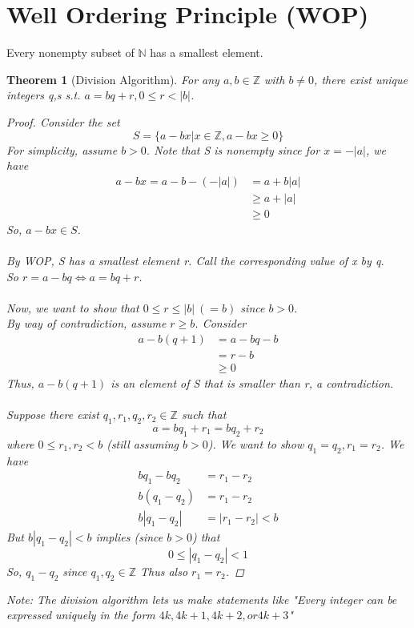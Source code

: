 \documentclass[letterpaper]{article}
\newtheorem{theorem}{Theorem}[section]
\begin{document}
\section{Well Ordering Principle (WOP)}
    Every nonempty subset of $\mathbb{N}$ has a smallest element.
    \begin{theorem} [Division Algorithm]
        For any $a,b\in\mathbb{Z}$ with $b\neq 0$, there exist unique integers q,s s.t.
        $a=bq+r, 0\leq r<|b|$.
        \begin{proof}
            Consider the set 
            \[ S=\{a-bx|x\in\mathbb{Z}, a-bx\geq 0\} \]
            For simplicity, assume $b>0$. Note that S is nonempty since for $x=-|a|$, we have
            \begin{align*}
                a-bx = a-b-(-|a|) &= a+b|a| \\
                & \geq a+|a| \\
                & \geq 0
            \end{align*}
            So, $a-bx\in S$. \\\\
            By WOP, S has a smallest element r. Call the corresponding value of x by q. \\
            So $r=a-bq \Leftrightarrow a=bq+r$. \\\\
            Now, we want to show that $0\leq r\leq |b|\ (=b)$ since $b>0$. \\
            By way of contradiction, assume $r\geq b$. 
            Consider
            \begin{align*}
                a-b(q+1) &= a-bq-b \\
                &= r-b \\
                & \geq 0
            \end{align*}
            Thus, $a-b(q+1)$ is an element of S that is smaller than r, a contradiction. \\\\
            Suppose there exist $q_1,r_1,q_2,r_2\in\mathbb{Z}$ such that 
            \[ a=bq_1+r_1 = bq_2+r_2 \]
            where $0\leq r_1,r_2 < b$ (still assuming $b > 0$).
            We want to show $q_1=q_2, r_1=r_2$.
            We have 
            \begin{align*}
                bq_1-bq_2 &= r_1-r_2 \\
                b(q_1-q_2) &= r_1-r_2 \\
                b|q_1-q_2| &= |r_1-r_2| < b
            \end{align*}
            But $b|q_1-q_2| < b$ implies (since $b > 0$) that 
            \[ 0\leq |q_1-q_2|<1 \]
            So, $q_1-q_2$ since $q_1,q_2\in\mathbb{Z}$
            Thus also $r_1=r_2$.
        \end{proof}
    Note: The division algorithm lets us make statements like "Every integer can be 
    expressed uniquely in the form $4k, 4k+1, 4k+2, or 4k+3$"
    \end{theorem}
\end{document}
